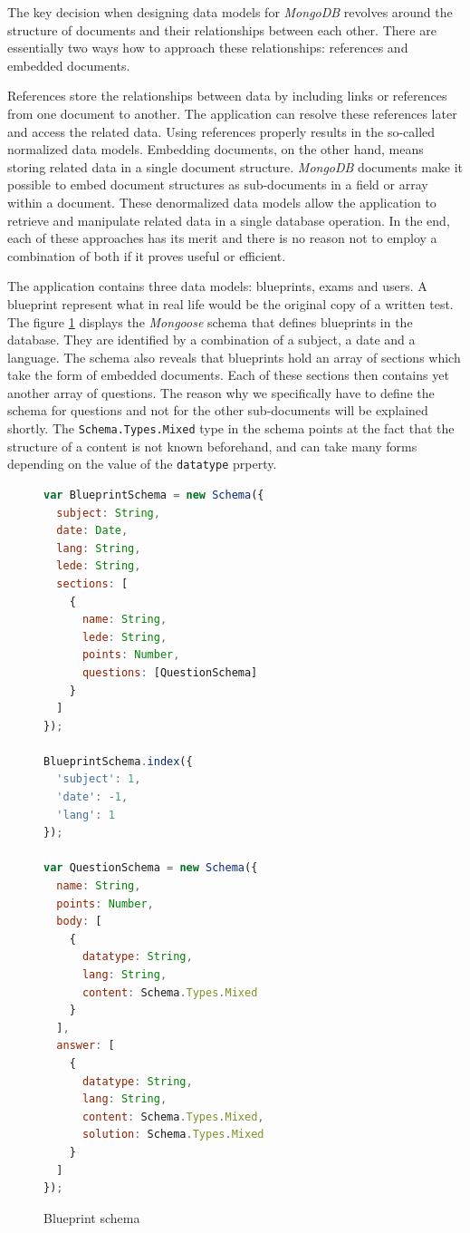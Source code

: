 \documentclass[thesis=M,english,hidelinks]{FITthesis}[2012/10/20]
\newcommand{\code}{\texttt}
\begin{document}
The key decision when designing data models for \textit{MongoDB} revolves around the structure of documents and their relationships between each other. There are essentially two ways how to approach these relationships: references and embedded documents.

References store the relationships between data by including links or references from one document to another. The application can resolve these references later and access the related data. Using references properly results in the so-called normalized data models. Embedding documents, on the other hand, means storing related data in a single document structure. \textit{MongoDB} documents make it possible to embed document structures as sub-documents in a field or array within a document. These denormalized data models allow the application to retrieve and manipulate related data in a single database operation. In the end, each of these approaches has its merit and there is no reason not to employ a combination of both if it proves useful or efficient.

The application contains three data models: blueprints, exams and users. A blueprint represent what in real life would be the original copy of a written test. The figure \ref{fig:blueprint_schema} displays the \textit{Mongoose} schema that defines blueprints in the database. They are identified by a combination of a subject, a date and a language. The schema also reveals that blueprints hold an array of sections which take the form of embedded documents. Each of these sections then contains yet another array of questions. The reason why we specifically have to define the schema for questions and not for the other sub-documents will be explained shortly. The \code{Schema.Types.Mixed} type in the schema points at the fact that the structure of a content is not known beforehand, and can take many forms depending on the value of the \code{datatype} prperty.

\begin{figure}
  \begin{lstlisting}[language=JavaScript]
var BlueprintSchema = new Schema({
  subject: String,
  date: Date,
  lang: String,
  lede: String,
  sections: [
    {
      name: String,
      lede: String,
      points: Number,
      questions: [QuestionSchema]
    }
  ]
});

BlueprintSchema.index({
  'subject': 1,
  'date': -1,
  'lang': 1
});

var QuestionSchema = new Schema({
  name: String,
  points: Number,
  body: [
    {
      datatype: String,
      lang: String,
      content: Schema.Types.Mixed
    }
  ],
  answer: [
    {
      datatype: String,
      lang: String,
      content: Schema.Types.Mixed,
      solution: Schema.Types.Mixed
    }
  ]
});
  \end{lstlisting}
  \caption{Blueprint schema}
  \label{fig:blueprint_schema}
\end{figure}
\end{document}
